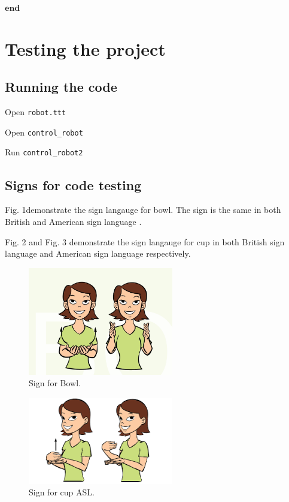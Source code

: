 \documentclass[lettersize,journal]{IEEEtran}
\begin{document}
\begin{algorithm}[H]
\begin{algorithmic}
\STATE \hspace{0.5cm}$ \textbf{end }  $

        

\end{algorithmic}
\label{alg2}
\end{algorithm}

\section{Testing the project}

\subsection {Running the code}

\begin{list}{}{}
\item{Open \texttt{robot.ttt}}
\item{Open  \texttt{control\_robot}}
\item{Run \texttt{control\_robot2}}
\end{list}



\subsection {Signs for code testing}
Fig. 1demonstrate the sign langauge for bowl. The sign is the same in both British and American sign language .

Fig. 2 and Fig. 3 demonstrate the sign langauge for cup in both British sign language and American sign language respectively.

\begin{figure}[h]
\centering
\includegraphics[width=2.5in]{pic1}
\caption{Sign for Bowl.}
\label{fig_1}
\end{figure}

\begin{figure}[h]
\centering
\includegraphics[width=2.5in]{pic2}
\caption{Sign for cup ASL.}
\label{fig_2}
\end{figure}
\end{document}

